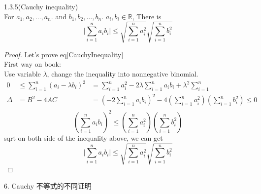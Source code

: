 \begin{proposition}
	1.3.5(Cauchy inequality)\\
	For $ a_1,a_2,\dots,a_n.$ and $b_1,b_2,\dots,b_n$. $ a_i,b_i\in\mathbb{R} $, There is
	\begin{equation}\label{CauchyInequality}
		\Big|\sum_{i=1}^n a_i b_i\Big| \le \sqrt{\sum_{i=1}^n a_i^2}\sqrt{\sum_{i=1}^n b_i^2}
	\end{equation}
\end{proposition}
\begin{proof}
	Let's prove eq\ref{CauchyInequality}\\
	First way on book:\\
	Use variable $ \lambda $, change the inequality into nonnegative binomial.
	\begin{align*}
		0&\le\sum_{i=1}^n (a_i -\lambda b_i)^2 
		&=\sum_{i=1}^n a_i^2 - 2\lambda\sum_{i=1}^na_ib_i + \lambda^2\sum_{i=1}^n\\
		\Delta &= B^2-4AC &=(-2\sum_{i=1}^n a_ib_i)^2 - 4(\sum_{i=1}^na_i^2)(\sum_{i=1}^nb_i^2)\le0\\	
	\end{align*}
	\begin{equation*}
		(\sum_{i=1}^n a_ib_i)^2 \le (\sum_{i=1}^na_i^2)(\sum_{i=1}^nb_i^2)
	\end{equation*}
	sqrt on both side of the inequality above, we can get
	\begin{equation*}
		\Big|\sum_{i=1}^n a_i b_i\Big| \le \sqrt{\sum_{i=1}^n a_i^2}\sqrt{\sum_{i=1}^n b_i^2}
	\end{equation*}
\end{proof}
6. Cauchy 不等式的不同证明


